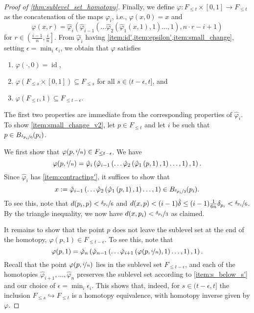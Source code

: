 \begin{proof}[Proof of \cref{thm:sublevel_set_homotopy}]

	Finally, we define $\varphi \colon F_{\leq t} \times [0,1] \to F_{\leq t}$ as the concatenation of the maps $\hat{\varphi}_{i}$, i.e., $\varphi(x,0) = x$ and
	\[\varphi(x,r) = \hat{\varphi}_{i} \left( \hat{\varphi}_{i-1} \left( \dots \hat{\varphi}_{2} \left( \hat{\varphi}_{1} \left( x, 1 \right), 1 \right) \dots, 1 \right), n \cdot r - i + 1\right)\] for $r \in \left( \frac{i-1}{n}, \frac{i}{n} \right]$.
	From $\hat{\varphi}_{i}$ having \cref{item:id',item:epsilon',item:small_change}, setting $\epsilon = \min_{i} \epsilon_{i}$, we obtain that $\varphi$ satisfies
	\begin{enumerate}[label={(\arabic*'')}]
		\item $\varphi(\cdot, 0) = \operatorname{id}$,
		\item $\varphi(F_{\leq s} \times [0,1]) \subseteq F_{\leq s}$ for all $s \in (t - \epsilon, t]$, and
		\item $\varphi(F_{\leq t}, 1) \subseteq F_{\leq t - \epsilon}$.\label{item:small_change_v2}
	\end{enumerate}
	The first two properties are immediate from the corresponding properties of $\hat{\varphi}_{i}$.
	To show \cref{item:small_change_v2},
	let $p \in F_{\leq t}$ and let $i$ be such that
	$p \in B_{\nicefrac{\delta_{p_{i}}}{6}}(p_{i})$.

	We first show that $\varphi(p, \nicefrac i n) \in F_{\leq t - \epsilon}$.
	We have
	\[
	\varphi(p, \nicefrac i n) = \hat{\varphi}_{i} \left( \hat{\varphi}_{i-1} \left( \dots \hat{\varphi}_{2} \left( \hat{\varphi}_{1} \left( p, 1 \right), 1 \right) \dots, 1 \right), 1\right).\]
	Since $\hat{\varphi}_{i}$ has \cref{item:contracting'}, it suffices to show that \[x:=\hat{\varphi}_{i-1} \left( \dots \hat{\varphi}_{2} \left( \hat{\varphi}_{1} \left( p, 1 \right), 1 \right) \dots, 1 \right) \in B_{\nicefrac{\delta_{p_{i}}}{3}}(p_{i}).\]
	To see this, note that $d(p_i, p) < \nicefrac{\delta_{p_{i}}}{6}$ and $d(x,p) < (i-1)\hat{\delta} \leq (i-1) \frac 1 {6n} \delta_{p_{i}} < \nicefrac{\delta_{p_{i}}}{6}$.
	By the triangle inequality, we now have $d(x, p_i) < \nicefrac{\delta_{p_{i}}}{3}$ as claimed.

	It remains to show that the point $p$ does not leave the sublevel set at the end of the homotopy, $\varphi(p, 1) \in F_{\leq t - \epsilon}$.
	To see this, note that
		\[
	\varphi(p, 1) =
	\hat{\varphi}_{n} \left( \hat{\varphi}_{n-1} \left( \dots
	\hat{\varphi}_{i+1} \left(
	\varphi(p, \nicefrac i n) , 1 \right)\dots, 1\right), 1 \right).\]
	Recall that the point $\varphi(p, \nicefrac i n)$ lies in the sublevel set $F_{\leq t - \epsilon}$, and each of the homotopies $\hat{\varphi}_{i+1}, \dots, \hat{\varphi}_n$ preserves the sublevel set according to \cref{item:s_below_s'} and our choice of $\epsilon = \min_{i} \epsilon_{i}$.
	This shows that, indeed, for $s \in (t - \epsilon, t]$ the inclusion $F_{\leq s} \hookrightarrow F_{\leq t}$ is a homotopy equivalence, with homotopy inverse given by $\varphi$.
\end{proof}
